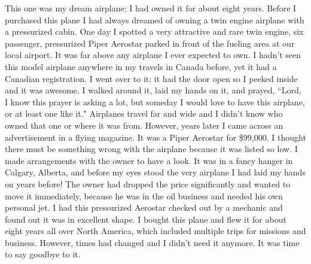 \documentclass[oneside,12pt]{book}
\begin{document}
This one was my dream airplane; I had owned it for about eight years. Before I purchased this plane I had always dreamed of owning a twin engine airplane with a pressurized cabin. One day I spotted a very attractive and rare twin engine, six passenger, pressurized Piper Aerostar parked in front of the fueling area at our local airport. It was far above any airplane I ever expected to own. I hadn't seen this model airplane anywhere in my travels in Canada before, yet it had a Canadian registration. I went over to it; it had the door open so I peeked inside and it was awesome. I walked around it, laid my hands on it, and prayed, ``Lord, I know this prayer is asking a lot, but someday I would love to have this airplane, or at least one like it." Airplanes travel far and wide and I didn't know who owned that one or where it was from. However, years later I came across an advertisement in a flying magazine. It was a Piper Aerostar for \$99,000. I thought there must be something wrong with the airplane because it was listed so low. I made arrangements with the owner to have a look. It was in a fancy hanger in Calgary, Alberta, and before my eyes stood the very airplane I had laid my hands on years before! The owner had dropped the price significantly and wanted to move it immediately, because he was in the oil business and needed his own personal jet. I had this pressurized Aerostar checked out by a mechanic and found out it was in excellent shape. I bought this plane and flew it for about eight years all over North America, which included multiple trips for missions and business. However, times had changed and I didn't need it anymore. It was time to say goodbye to it.
\end{document}
